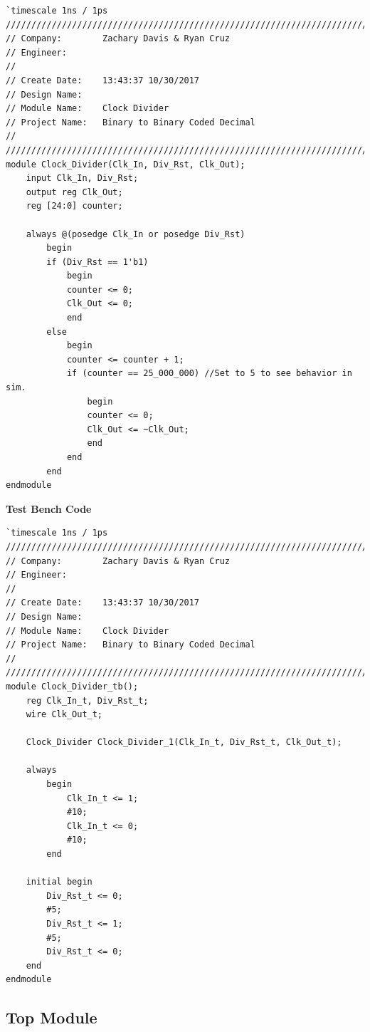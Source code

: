 \documentclass[12pt]{report}
\begin{document}
			\begin{Verbatim}[frame=single, fontsize=\small]
`timescale 1ns / 1ps
////////////////////////////////////////////////////////////////////////////////
// Company:        Zachary Davis & Ryan Cruz
// Engineer: 
// 
// Create Date:    13:43:37 10/30/2017 
// Design Name:    
// Module Name:    Clock Divider
// Project Name:   Binary to Binary Coded Decimal
//
////////////////////////////////////////////////////////////////////////////////
module Clock_Divider(Clk_In, Div_Rst, Clk_Out);
	input Clk_In, Div_Rst;
	output reg Clk_Out;
	reg [24:0] counter;
	
	always @(posedge Clk_In or posedge Div_Rst)
		begin
		if (Div_Rst == 1'b1)
			begin
			counter <= 0;
			Clk_Out <= 0;
			end
		else
			begin
			counter <= counter + 1;
			if (counter == 25_000_000) //Set to 5 to see behavior in sim.
				begin
				counter <= 0;
				Clk_Out <= ~Clk_Out;
				end
			end
		end
endmodule
			\end{Verbatim}
		
		\vspace{1cm}

		
	\textbf{Test Bench Code}

			\begin{Verbatim}[frame=single, fontsize=\small]
`timescale 1ns / 1ps
////////////////////////////////////////////////////////////////////////////////
// Company:        Zachary Davis & Ryan Cruz
// Engineer: 
// 
// Create Date:    13:43:37 10/30/2017 
// Design Name:    
// Module Name:    Clock Divider
// Project Name:   Binary to Binary Coded Decimal
//
////////////////////////////////////////////////////////////////////////////////
module Clock_Divider_tb();
	reg Clk_In_t, Div_Rst_t;
	wire Clk_Out_t;
	
	Clock_Divider Clock_Divider_1(Clk_In_t, Div_Rst_t, Clk_Out_t);
	
	always
		begin
			Clk_In_t <= 1;
			#10;
			Clk_In_t <= 0;
			#10;
		end
	
	initial begin
		Div_Rst_t <= 0;
		#5;
		Div_Rst_t <= 1;
		#5;
		Div_Rst_t <= 0;
	end
endmodule
			\end{Verbatim}
		\paragraph*{}
			
\subsection*{Top Module}
\end{document}
